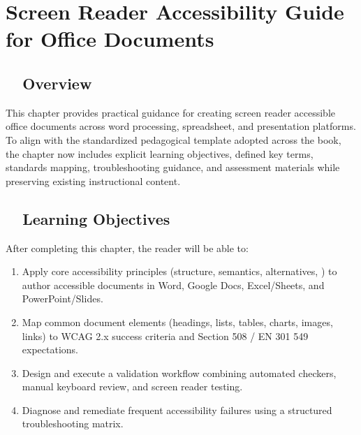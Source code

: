 \chapter{Screen Reader Accessibility Guide for Office Documents}\label{ch15:office-accessibility}

\section{~~Overview}\label{ch15:sec:overview}
This chapter provides practical guidance for creating screen reader accessible office documents across word processing, spreadsheet, and presentation platforms. To align with the standardized pedagogical template adopted across the book, the chapter now includes explicit learning objectives, defined key terms, standards mapping, troubleshooting guidance, and assessment materials while preserving existing instructional content.

\section{~~Learning Objectives}\label{ch15:sec:learning-objectives}
After completing this chapter, the reader will be able to:
\begin{enumerate}
	\item Apply core accessibility principles (structure, semantics, alternatives, ) to author accessible documents in Word, Google Docs, Excel/Sheets, and PowerPoint/Slides.
	\item Map common document elements (headings, lists, tables, charts, images, links) to WCAG 2.x success criteria and Section 508 / EN 301 549 expectations.
	\item Design and execute a validation workflow combining automated checkers, manual keyboard review, and screen reader testing.
	\item Diagnose and remediate frequent accessibility failures using a structured troubleshooting matrix.
\end{enumerate}

